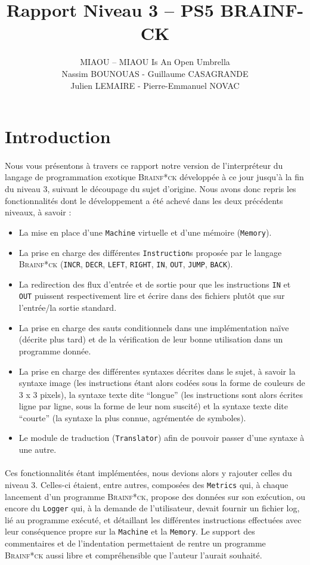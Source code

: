 \documentclass[a4paper]{article}
\title{Rapport Niveau 3 – PS5 BRAINF-CK}
\author{MIAOU – MIAOU Is An Open Umbrella\\
Nassim BOUNOUAS - Guillaume CASAGRANDE \\ Julien LEMAIRE - Pierre-Emmanuel NOVAC}
\begin{document}
\maketitle

\section{Introduction}
\paragraph{}Nous vous présentons à travers ce rapport notre version de l'interpréteur du langage de programmation exotique \textsc{Brainf*ck} développée à ce jour jusqu'à la fin du niveau 3, suivant le découpage du sujet d'origine. Nous avons donc repris les fonctionnalités dont le développement a été achevé dans les deux précédents niveaux, à savoir :
\begin{itemize}
	\item La mise en place d'une \texttt{Machine} virtuelle et d'une mémoire (\texttt{Memory}).
	\item La prise en charge des différentes \texttt{Instruction}s proposée par le langage \textsc{Brainf*ck} (\texttt{INCR}, \texttt{DECR}, \texttt{LEFT}, \texttt{RIGHT}, \texttt{IN}, \texttt{OUT}, \texttt{JUMP}, \texttt{BACK}).
	\item La redirection des flux d'entrée et de sortie pour que les instructions \texttt{IN} et \texttt{OUT} puissent respectivement lire et écrire dans des fichiers plutôt que sur l'entrée/la sortie standard.
	\item La prise en charge des sauts conditionnels dans une implémentation naïve (décrite plus tard) et de la vérification de leur bonne utilisation dans un programme donnée.
	\item La prise en charge des différentes syntaxes décrites dans le sujet, à savoir la syntaxe image (les instructions étant alors codées sous la forme de couleurs de 3 x 3 pixels), la syntaxe texte dite ``longue'' (les instructions sont alors écrites ligne par ligne, sous la forme de leur nom suscité) et la syntaxe texte dite ``courte'' (la syntaxe la plus connue, agrémentée de symboles).
	\item Le module de traduction (\texttt{Translator}) afin de pouvoir passer d'une syntaxe à une autre.
\end{itemize}
\paragraph{}Ces fonctionnalités étant implémentées, nous devions alors y rajouter celles du niveau 3. Celles-ci étaient, entre autres, composées des \texttt{Metrics} qui, à chaque lancement d'un programme \textsc{Brainf*ck}, propose des données sur son exécution, ou encore du \texttt{Logger} qui, à la demande de l'utilisateur, devait fournir un fichier log, lié au programme exécuté, et détaillant les différentes instructions effectuées avec leur conséquence propre sur la \texttt{Machine} et la \texttt{Memory}. Le support des commentaires et de l'indentation permettaient de rentre un programme \textsc{Brainf*ck} aussi libre et compréhensible que l'auteur l'aurait souhaité.
\end{document}
